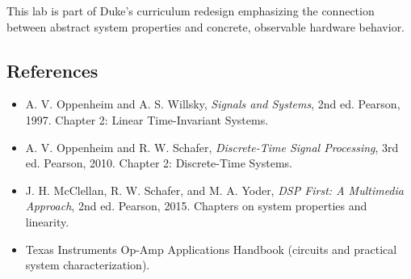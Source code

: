 \documentclass[11pt,letterpaper]{article}
\begin{document}
This lab is part of Duke's curriculum redesign emphasizing the connection between abstract system properties and concrete, observable hardware behavior.

\subsection*{References}

\begin{itemize}
    \item A. V. Oppenheim and A. S. Willsky, \textit{Signals and Systems}, 2nd ed. Pearson, 1997. Chapter 2: Linear Time-Invariant Systems.
    \item A. V. Oppenheim and R. W. Schafer, \textit{Discrete-Time Signal Processing}, 3rd ed. Pearson, 2010. Chapter 2: Discrete-Time Systems.
    \item J. H. McClellan, R. W. Schafer, and M. A. Yoder, \textit{DSP First: A Multimedia Approach}, 2nd ed. Pearson, 2015. Chapters on system properties and linearity.
    \item Texas Instruments Op-Amp Applications Handbook (circuits and practical system characterization).
\end{itemize}
\end{document}
